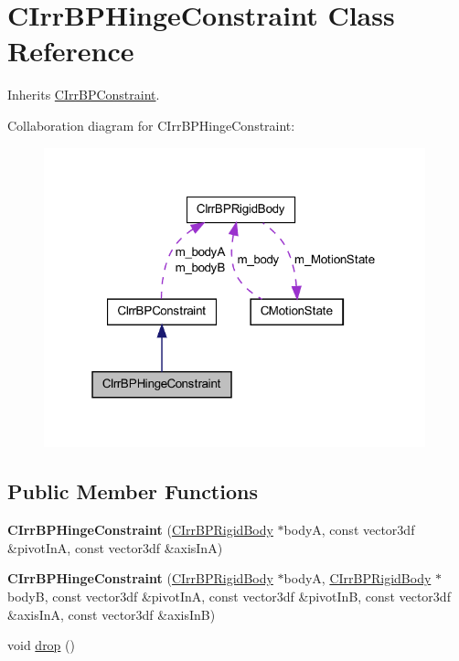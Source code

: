 \hypertarget{class_c_irr_b_p_hinge_constraint}{
\section{CIrrBPHingeConstraint Class Reference}
\label{class_c_irr_b_p_hinge_constraint}
}


Inherits \hyperlink{class_c_irr_b_p_constraint}{CIrrBPConstraint}.



Collaboration diagram for CIrrBPHingeConstraint:\nopagebreak
\begin{figure}[H]
\begin{center}
\leavevmode
\includegraphics[width=313pt]{class_c_irr_b_p_hinge_constraint__coll__graph}
\end{center}
\end{figure}
\subsection*{Public Member Functions}
\begin{DoxyCompactItemize}
\item 
\hypertarget{class_c_irr_b_p_hinge_constraint_affb8842f43c680b6d1e86a393e7bca85}{
{\bfseries CIrrBPHingeConstraint} (\hyperlink{class_c_irr_b_p_rigid_body}{CIrrBPRigidBody} $\ast$bodyA, const vector3df \&pivotInA, const vector3df \&axisInA)}
\label{class_c_irr_b_p_hinge_constraint_affb8842f43c680b6d1e86a393e7bca85}

\item 
\hypertarget{class_c_irr_b_p_hinge_constraint_a454755a449d4d86e0904ee51aade72ec}{
{\bfseries CIrrBPHingeConstraint} (\hyperlink{class_c_irr_b_p_rigid_body}{CIrrBPRigidBody} $\ast$bodyA, \hyperlink{class_c_irr_b_p_rigid_body}{CIrrBPRigidBody} $\ast$bodyB, const vector3df \&pivotInA, const vector3df \&pivotInB, const vector3df \&axisInA, const vector3df \&axisInB)}
\label{class_c_irr_b_p_hinge_constraint_a454755a449d4d86e0904ee51aade72ec}

\item 
void \hyperlink{class_c_irr_b_p_hinge_constraint_a8c9ba8b2ee3bdff9ea684f2200c302ce}{drop} ()
\end{DoxyCompactItemize}
